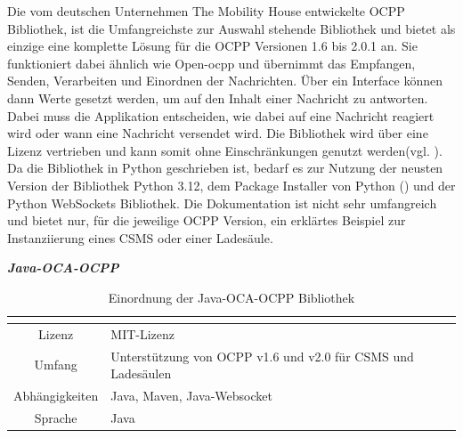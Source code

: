 \noindent Die vom deutschen Unternehmen \glqq{}The Mobility House\grqq{} entwickelte OCPP Bibliothek, ist die Umfangreichste zur Auswahl stehende Bibliothek und bietet als einzige eine komplette Lösung für die OCPP Versionen 1.6 bis 2.0.1 an. Sie funktioniert dabei ähnlich wie Open-ocpp und übernimmt das Empfangen, Senden, Verarbeiten und Einordnen der Nachrichten. Über ein Interface können dann Werte gesetzt werden, um auf den Inhalt einer Nachricht zu antworten. Dabei muss die Applikation entscheiden, wie dabei auf eine Nachricht reagiert wird oder wann eine Nachricht versendet wird. Die Bibliothek wird über eine  Lizenz vertrieben und kann somit ohne Einschränkungen genutzt werden(vgl. \cite{MIT-Lizenz}). Da die Bibliothek in Python geschrieben ist, bedarf es zur Nutzung der neusten Version der Bibliothek Python 3.12, dem Package Installer von Python () und der Python WebSockets Bibliothek. Die Dokumentation ist nicht sehr umfangreich und bietet nur, für die jeweilige OCPP Version, ein erklärtes Beispiel zur Instanziierung eines \acs{CSMS} oder einer Ladesäule.
\begin{table}[H]
	\textbf{\textit{Java-OCA-OCPP}}\cite{Java-OCA}\\
	\begin{tabularx}{\textwidth}{| c | X |}
		\multicolumn{1}{c}{} & \multicolumn{1}{c}{}\\ \hline
		Lizenz & MIT-Lizenz\newline \\
		Umfang & Unterstützung von OCPP v1.6 und v2.0 für \acs{CSMS} und Ladesäulen\newline \\
		Abhängigkeiten & Java, Maven, Java-Websocket\newline \\
		Sprache & Java\\ \hline
	\end{tabularx}
	\caption{\label{tab:test_tabelle} Einordnung der Java-OCA-OCPP Bibliothek \cite{Eigene_Darstellung}}
\end{table}

